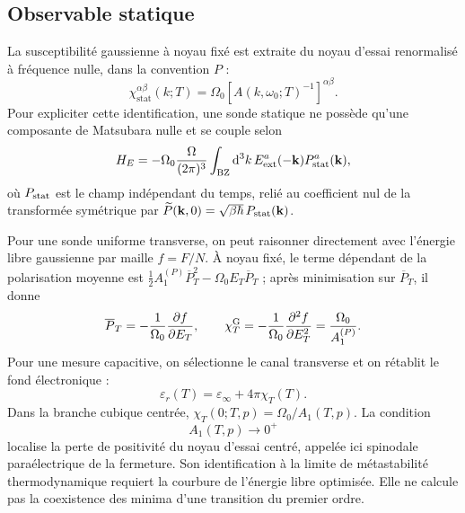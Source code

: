 \subsection{Observable statique}

La susceptibilité gaussienne à noyau fixé est extraite du noyau d’essai
renormalisé à fréquence nulle, dans la convention $P$ :
\begin{equation}
\chi_{\mathrm{stat}}^{\alpha\beta}(k;T)
=\Omega_0
\left[A(k,\omega_0;T)^{-1}\right]^{\alpha\beta}.
\label{eq:ann_chi_statique}
\end{equation}
Pour expliciter cette identification, une sonde statique ne possède qu'une
composante de Matsubara nulle et se couple selon
\begin{equation}
H_E=-\Omega_0\frac{\Omega}{(2\pi)^3}
\int_{\rm BZ}\mathrm d^3k\,
E_{\rm ext}^a(-\mathbf k)P_{\rm stat}^a(\mathbf k),
\label{eq:core_electric_source}
\end{equation}
où $P_{\rm stat}$ est le champ indépendant du temps, relié au coefficient
nul de la transformée symétrique par
$\widetilde P(\mathbf k,0)=\sqrt{\beta\hbar}\,P_{\rm stat}(\mathbf k)$.

Pour une sonde uniforme transverse, on peut raisonner directement avec
l'énergie libre gaussienne par maille $f=F/N$. À noyau fixé, le terme dépendant
de la polarisation moyenne est
$\tfrac12 A_1^{(P)}\overline P_T^2-\Omega_0E_T\overline P_T$ ; après
minimisation sur $\overline P_T$, il donne
\begin{equation}
\overline P_T=-\frac{1}{\Omega_0}\frac{\partial f}{\partial E_T},
\qquad
\chi_T^{\rm G}=-\frac{1}{\Omega_0}\frac{\partial^2f}{\partial E_T^2}
=\frac{\Omega_0}{A_1^{(P)}}.
\label{eq:core_dielectric_free_energy_derivatives}
\end{equation}
Pour une mesure
capacitive, on sélectionne le canal transverse et on rétablit le fond électronique :
\begin{equation}
\varepsilon_r(T)=\varepsilon_\infty+4\pi\chi_T(T).
\label{eq:core_relative_permittivity}
\end{equation}
Dans la branche cubique centrée,
$\chi_T(0;T,p)=\Omega_0/A_1(T,p)$. La condition
\begin{equation}
A_1(T,p)\longrightarrow0^+
\label{eq:core_paraelectric_spinodal}
\end{equation}
localise la perte de positivité du noyau d'essai centré, appelée ici
spinodale paraélectrique de la fermeture. Son identification à la limite de
métastabilité thermodynamique requiert la courbure de l'énergie libre optimisée.
Elle ne calcule pas la coexistence
des minima d'une transition du premier ordre.

